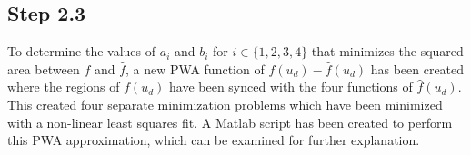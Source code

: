 \subsection*{Step 2.3}

To determine the values of $a_i$ and $b_i$ for $i \in \{1,2,3,4\}$ that minimizes the squared area between $f$ and $\hat{f}$, a new PWA function of $f(u_d)-\hat{f}(u_d)$ has been created where the regions of $f(u_d)$ have been synced with the four functions of $\hat{f}(u_d)$. This created four separate minimization problems which have been minimized with a non-linear least squares fit. A Matlab script has been created to perform this PWA approximation, which can be examined for further explanation.

